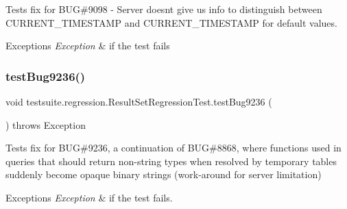 Tests fix for B\+UG\#9098 -\/ Server doesn\textquotesingle{}t give us info to distinguish between C\+U\+R\+R\+E\+N\+T\+\_\+\+T\+I\+M\+E\+S\+T\+A\+MP and \textquotesingle{}C\+U\+R\+R\+E\+N\+T\+\_\+\+T\+I\+M\+E\+S\+T\+A\+MP\textquotesingle{} for default values.


\begin{DoxyExceptions}{Exceptions}
{\em Exception} & if the test fails \\
\hline
\end{DoxyExceptions}
\mbox{\label{classtestsuite_1_1regression_1_1_result_set_regression_test_ad29ed5c9d0749bc7bbdcbbacd1b45910}} 
\subsubsection{\texorpdfstring{test\+Bug9236()}{testBug9236()}}
{\footnotesize\ttfamily void testsuite.\+regression.\+Result\+Set\+Regression\+Test.\+test\+Bug9236 (\begin{DoxyParamCaption}{ }\end{DoxyParamCaption}) throws Exception}

Tests fix for B\+UG\#9236, a continuation of B\+UG\#8868, where functions used in queries that should return non-\/string types when resolved by temporary tables suddenly become opaque binary strings (work-\/around for server limitation)


\begin{DoxyExceptions}{Exceptions}
{\em Exception} & if the test fails. \\
\hline
\end{DoxyExceptions}
\mbox{\label{classtestsuite_1_1regression_1_1_result_set_regression_test_aa1115212e57fbb7e7c76c150db7d5ff5}} 
